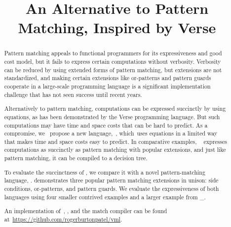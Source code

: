 \documentclass[manuscript,screen 12pt, nonacm]{acmart}
\title{An Alternative to Pattern Matching, Inspired by Verse}
\begin{document}
\begin{abstract}
    Pattern matching %
    appeals %
    to functional programmers for its expressiveness and good cost model, 
    but 
    it %
    fails to express %
    certain computations without verbosity. Verbosity %
    can be reduced %
    by using extended forms of pattern matching,
    but extensions %
    are %
    not standardized, and making certain extensions like or-patterns and pattern
    guards cooperate in a large-scale programming language is a significant
    implementation challenge that has not seen success until recent years. 
    
    
    Alternatively to pattern matching, computations can be expressed succinctly
    by using equations, as has been demonstrated by the Verse programming
    language. But such computations may have time and space costs that can be
    hard to predict. 
    As a compromise, 
    we %
    ~propose %
    a new language,~\VMinus, %
    which~uses equations in a limited way that makes time and space costs easy
    to predict. 
    In
    comparative examples,
    \VMinus~ %
    expresses %
    computations as succinctly as pattern matching with popular extensions, and just like pattern matching, it %
    can be compiled %
    to a decision tree. 
    
    To evaluate %
    the succinctness of \VMinus,
    we compare %
    it with a novel pattern-matching language, \PPlus. \PPlus
    demonstrates  %
    three popular pattern matching extensions 
    in unison: side conditions, or-patterns, and pattern guards. 
    We evaluate %
    the expressiveness of both languages using four smaller contrived examples 
    and a larger example from \_. 

    An implementation of~\VMinus, \PPlus, and the match compiler can be found
    at~\url{https://github.com/rogerburtonpatel/vml}.
\end{abstract}

\maketitle
\end{document}
